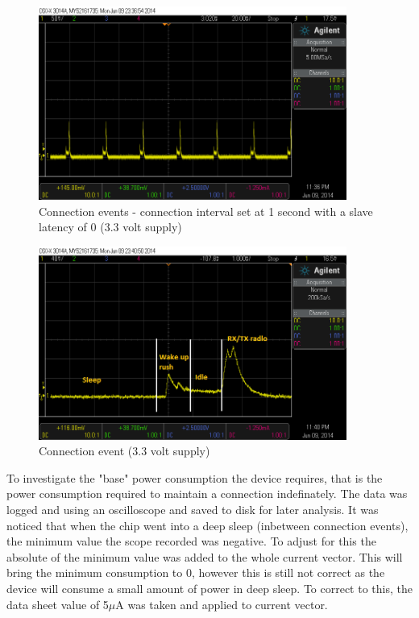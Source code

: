 \documentclass[]{article}
\begin{document}
\begin{figure}[H]
	\begin{center}
		\includegraphics[width = 0.9\textwidth]{ce}
	\end{center}
	\caption{Connection events - connection interval set at 1 second with a slave latency of 0 (3.3 volt supply)}
	\label{fig:ce}
\end{figure}

\begin{figure}[H]
	\begin{center}
		\includegraphics[width = 0.9\textwidth]{ceclose}
	\end{center}
	\caption{Connection event (3.3 volt supply)}
	\label{fig:ceclose}
\end{figure}


 To investigate the "base" power consumption the device requires, that is the power consumption required to maintain a connection indefinately. The data was logged and using an oscilloscope and saved to disk for later analysis. It was noticed that when the chip went into a deep sleep (inbetween connection events), the minimum value the scope recorded was negative. To adjust for this the absolute of the minimum value was added to the whole current vector. This will bring the minimum consumption to 0, however this is still not correct as the device will consume a small amount of power in deep sleep. To correct to this, the data sheet value of 5$\mu$A was taken and applied to current vector. 
\end{document}
